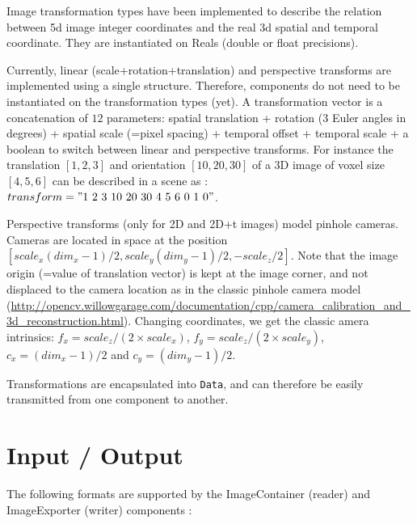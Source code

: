 \noindent Image transformation types have been implemented to describe the relation between 5d image integer coordinates and the real 3d spatial and temporal coordinate. They are instantiated on Reals (double or float precisions).

\noindent Currently, linear (scale+rotation+translation) and perspective transforms are implemented using a single structure. Therefore, components do not need to be instantiated on the transformation types (yet). A transformation vector is a concatenation of $12$ parameters: spatial translation + rotation ($3$ Euler angles in degrees) + spatial scale (=pixel spacing) + temporal offset + temporal scale + a boolean to switch between linear and perspective transforms. For instance the translation  $[1,2,3]$ and orientation $[10,20,30]$ of a 3D image of voxel size $[4,5,6]$ can be described in a scene as : $transform="1 \ 2 \ 3 \ 10 \ 20 \ 30 \ 4 \ 5 \ 6 \ 0 \ 1 \ 0"$.

\noindent Perspective transforms (only for 2D and 2D+t images) model pinhole cameras. Cameras are located in space at the position $[scale_x(dim_x-1)/2, scale_y(dim_y-1)/2, -scale_z/2]$. 
Note that the image origin (=value of translation vector) is kept at the image corner, and not displaced to the camera location as in the classic pinhole camera model (\url{http://opencv.willowgarage.com/documentation/cpp/camera_calibration_and_3d_reconstruction.html}). 
Changing coordinates, we get the classic amera intrinsics: $f_x=scale_z/(2\times scale_x)$, $f_y=scale_z/(2\times scale_y)$, $c_x=(dim_x-1)/2$ and $c_y=(dim_y-1)/2$.

\noindent Transformations are encapsulated into \sofa{} \texttt{Data}, and can therefore be easily transmitted from one component to another. 


\section{Input / Output}

\noindent The following formats are supported by the ImageContainer (reader) and ImageExporter (writer) components :

